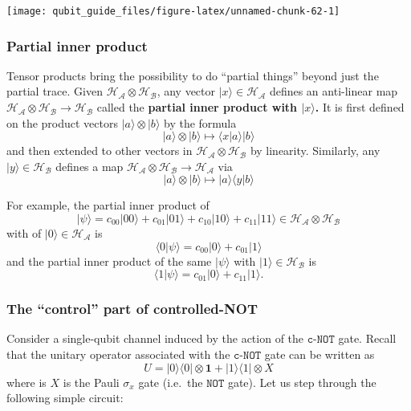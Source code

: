 \documentclass[fleqn]{article}
\begin{document}
\begin{center}\texttt{[image: qubit\_guide\_files/figure-latex/unnamed-chunk-62-1]} \end{center}

\hypertarget{partial-inner-product}{%
\subsubsection{Partial inner product}\label{partial-inner-product}}

Tensor products bring the possibility to do ``partial things'' beyond just the partial trace.
Given \(\mathcal{H}_{\mathcal{A}}\otimes\mathcal{H}_{\mathcal{B}}\), any vector \(|x\rangle\in\mathcal{H}_{\mathcal{A}}\) defines an anti-linear map \(\mathcal{H}_{\mathcal{A}}\otimes\mathcal{H}_{\mathcal{B}}\to\mathcal{H}_{\mathcal{B}}\) called the \textbf{partial inner product with \(|x\rangle\).}
It is first defined on the product vectors \(|a\rangle\otimes|b\rangle\) by the formula
\[
  |a\rangle\otimes|b\rangle
  \longmapsto \langle x|a\rangle|b\rangle
\]
and then extended to other vectors in \(\mathcal{H}_{\mathcal{A}}\otimes\mathcal{H}_{\mathcal{B}}\) by linearity.
Similarly, any \(|y\rangle\in\mathcal{H}_{\mathcal{B}}\) defines a map \(\mathcal{H}_{\mathcal{A}}\otimes\mathcal{H}_{\mathcal{B}}\to\mathcal{H}_{\mathcal{A}}\) via
\[
  |a\rangle\otimes|b\rangle
  \longmapsto |a\rangle\langle y|b\rangle
\]

For example, the partial inner product of
\[
  |\psi\rangle=c_{00}|00\rangle+c_{01}|01\rangle+c_{10}|10\rangle+c_{11}|11\rangle\in\mathcal{H}_{\mathcal{A}}\otimes\mathcal{H}_{\mathcal{B}}
\]
with of \(|0\rangle\in\mathcal{H}_{\mathcal{A}}\) is
\[
  \langle 0|\psi\rangle = c_{00}|0\rangle + c_{01}|1\rangle
\]
and the partial inner product of the same \(|\psi\rangle\) with \(|1\rangle\in\mathcal{H}_{\mathcal{B}}\) is
\[
  \langle 1|\psi\rangle = c_{01}|0\rangle + c_{11}|1\rangle.
\]

\hypertarget{control-controlled-NOT}{%
\subsubsection{The ``control'' part of controlled-NOT}\label{control-controlled-NOT}}

Consider a single-qubit channel induced by the action of the \(\texttt{c-NOT}\) gate.
Recall that the unitary operator associated with the \(\texttt{c-NOT}\) gate can be written as
\[
  U = |0\rangle\langle 0|\otimes\mathbf{1}+ |1\rangle\langle 1|\otimes X
\]
where is \(X\) is the Pauli \(\sigma_x\) gate (i.e.~the \(\texttt{NOT}\) gate).
Let us step through the following simple circuit:
\end{document}
